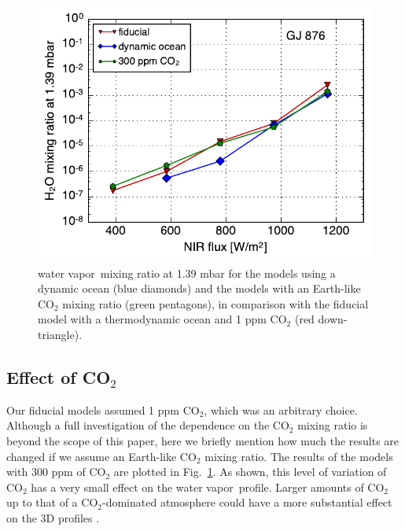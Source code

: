 \documentclass[11pt,numberedappendix,twocolappendix,]{emulateapj}
\newcommand{\wv}{water vapor\ }
\begin{document}
\begin{figure}[!h]
    \begin{center}
    \includegraphics[width=0.9\hsize]{fig/xH2O_sensitivity.pdf}
    \end{center}
\caption{\wv mixing ratio at 1.39 mbar for the models using a dynamic ocean (blue diamonds) and the models with an Earth-like CO$_2$ mixing ratio (green pentagons), in comparison with the fiducial model with a thermodynamic ocean and 1 ppm CO$_2$ (red down-triangle). }
\label{fig:change_ocean}
\end{figure}

\subsection{Effect of CO$_2$}
\label{ss:sensitivity_ocean}

Our fiducial models assumed 1 ppm CO$_2$, which was an arbitrary choice. 
Although a full investigation of the dependence on the CO$_2$ mixing ratio is beyond the scope of this paper, here we briefly mention how much the results are changed if we assume an Earth-like CO$_2$ mixing ratio. 
The results of the models with 300 ppm of CO$_2$ are plotted in Fig.~\ref{fig:change_ocean}. 
As shown, this level of variation of CO$_2$ has a very small effect on the \wv profile. 
Larger amounts of CO$_2$ up to that of a CO$_2$-dominated atmosphere could have a more substantial effect on the 3D profiles \citep{Wordsworth2013}. 


\end{document}
